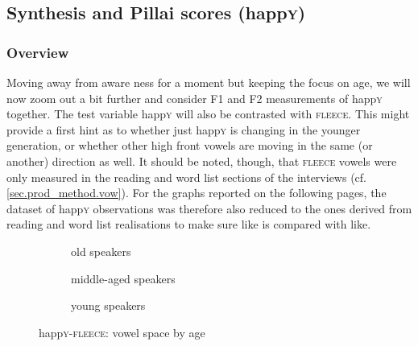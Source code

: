 \subsection{Synthesis and Pillai scores (happ\textrm{\textsc{y}})}
\label{sec.prod.res.vow.happy.pil}

\subsubsection{Overview}

Moving away from aware ness for a moment but keeping the focus on age, we will now zoom out a bit further and consider F1 and F2 measurements of happ\textsc{y} together.
The test variable happ\textsc{y} will also be contrasted with \textsc{fleece}.
This might provide a first hint as to whether just happ\textsc{y} is changing in the younger generation, or whether other high front vowels are moving in the same (or another) direction as well.
It should be noted, though, that \textsc{fleece} vowels were only measured in the reading and word list sections of the interviews (cf. \ref{sec.prod_method.vow}).
For the graphs reported on the following pages, the dataset of happ\textsc{y} observations was therefore also reduced to the ones derived from reading and word list realisations to make sure like is compared with like.

\begin{figure}[h!]
	\centering
	\begin{subfigure}{.49\textwidth}
		\centering
			\resizebox{\linewidth}{!}{} 
		\caption{old speakers}
		\label{fig.happy.space.old}
	\end{subfigure}
	
	\begin{subfigure}{.49\textwidth}
		\centering
			\resizebox{\linewidth}{!}{} 
		\caption{middle-aged speakers}
		\label{fig.happy.space.mid}
	\end{subfigure}
	\begin{subfigure}{.49\textwidth}
		\centering
			\resizebox{\linewidth}{!}{} 
		\caption{young speakers}
		\label{fig.happy.space.young}
	\end{subfigure}
	\caption{happ\textsc{y}-\textsc{fleece}: vowel space by age}
	\label{fig.happy.space}
\end{figure}

